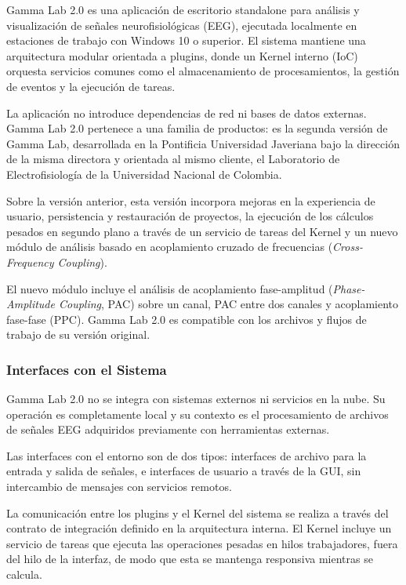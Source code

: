 \documentclass[12pt, letterpaper]{article}
\begin{document}
Gamma Lab 2.0 es una aplicación de escritorio standalone para análisis y
visualización de señales neurofisiológicas (EEG), ejecutada localmente en
estaciones de trabajo con Windows 10 o superior. El sistema mantiene una
arquitectura modular orientada a plugins, donde un Kernel interno (IoC)
orquesta servicios comunes como el almacenamiento de procesamientos, la
gestión de eventos y la ejecución de tareas.

La aplicación no introduce dependencias de red ni bases de datos externas.
Gamma Lab 2.0 pertenece a una familia de productos: es la segunda versión de
Gamma Lab, desarrollada en la Pontificia Universidad Javeriana bajo la
dirección de la misma directora y orientada al mismo cliente, el Laboratorio
de Electrofisiología de la Universidad Nacional de Colombia.

Sobre la versión anterior, esta versión incorpora mejoras en la experiencia
de usuario, persistencia y restauración de proyectos, la ejecución de los cálculos pesados
en segundo plano a través de un servicio de tareas del Kernel y un nuevo módulo
de análisis basado en acoplamiento cruzado de frecuencias
(\textit{Cross-Frequency Coupling}).

El nuevo módulo incluye el análisis de acoplamiento fase-amplitud
(\textit{Phase-Amplitude Coupling}, PAC) sobre un canal, PAC entre dos
canales y acoplamiento fase-fase (PPC). Gamma Lab 2.0 es compatible con los
archivos y flujos de trabajo de su versión original.

\subsubsection{Interfaces con el Sistema}

Gamma Lab 2.0 no se integra con sistemas externos ni servicios en la nube.
Su operación es completamente local y su contexto es el procesamiento de
archivos de señales EEG adquiridos previamente con herramientas externas.

Las interfaces con el entorno son de dos tipos: interfaces de archivo para la
entrada y salida de señales, e interfaces de usuario a través de la GUI, sin
intercambio de mensajes con servicios remotos.

La comunicación entre los plugins y el Kernel del sistema se realiza a través
del contrato de integración definido en la arquitectura interna. El Kernel
incluye un servicio de tareas que ejecuta las operaciones pesadas en hilos
trabajadores, fuera del hilo de la interfaz, de modo que esta se mantenga
responsiva mientras se calcula.
\end{document}
